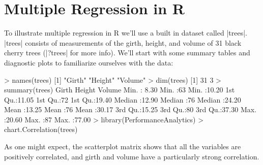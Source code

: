 

\section{Multiple Regression in R}

To illustrate multiple regression in R we'll use a built in dataset called |trees|. |trees| consists of measurements of the girth, height, and volume of 31 black cherry trees (|?trees| for more info). We'll start with some summary tables and diagnostic plots to familiarize ourselves with the data:
%
\begin{R}
> names(trees)
[1] "Girth"  "Height" "Volume"
> dim(trees)
[1] 31  3
> summary(trees)
     Girth           Height       Volume
 Min.   : 8.30   Min.   :63   Min.   :10.20
 1st Qu.:11.05   1st Qu.:72   1st Qu.:19.40
 Median :12.90   Median :76   Median :24.20
 Mean   :13.25   Mean   :76   Mean   :30.17
 3rd Qu.:15.25   3rd Qu.:80   3rd Qu.:37.30
 Max.   :20.60   Max.   :87   Max.   :77.00
> library(PerformanceAnalytics)
> chart.Correlation(trees)
\end{R}
%
As one might expect, the scatterplot matrix shows that all the variables are positively correlated, and girth and volume have a  particularly strong correlation.

